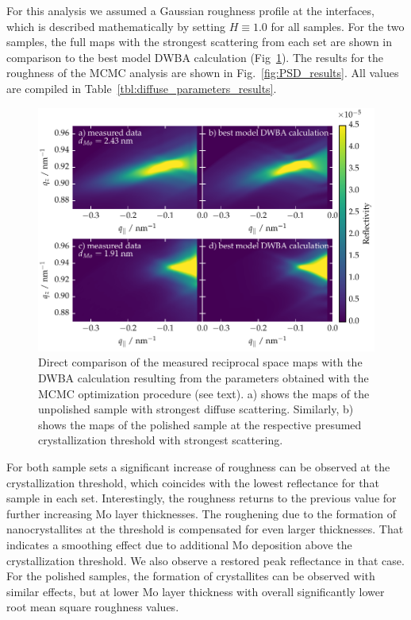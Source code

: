 For this analysis we assumed a Gaussian roughness profile at the interfaces, which is described mathematically by setting $H\equiv1.0$ for all samples. For the two samples, the full maps with the strongest scattering from each set are shown in comparison to the best model DWBA calculation (Fig~\ref{fig:dwba_data_best_model_comparison}). The results for the roughness of the MCMC analysis are shown in Fig.~\ref{fig:PSD_results}. All values are compiled in Table~\ref{tbl:diffuse_parameters_results}. 
\begin{figure}[htbp]
\centering
\includegraphics[width=\textwidth]{img/MoSiC_dwba_data_best_model_comparison}
\caption{Direct comparison of the measured reciprocal space maps with the DWBA calculation resulting from the parameters obtained with the MCMC optimization procedure (see text). a) shows the maps of the unpolished sample with strongest diffuse scattering. Similarly, b) shows the maps of the polished sample at the respective presumed crystallization threshold with strongest scattering.}
\label{fig:dwba_data_best_model_comparison}
\end{figure}

For both sample sets a significant increase of roughness can be observed at the crystallization threshold, which coincides with the lowest reflectance for that sample in each set. Interestingly, the roughness returns to the previous value for further increasing Mo layer thicknesses. The roughening due to the formation of nanocrystallites at the threshold is compensated for even larger thicknesses.
That indicates a smoothing effect due to additional Mo deposition above the crystallization threshold. We also observe a restored peak reflectance in that case. For the polished samples, the formation of crystallites can be observed with similar effects, but at lower Mo layer thickness with overall significantly lower root mean square roughness values.

